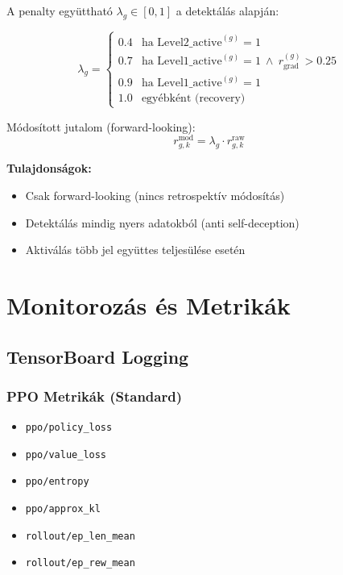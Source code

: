 \documentclass{article}
\begin{document}
A penalty együttható $\lambda_g\in[0,1]$ a detektálás alapján:

\begin{equation}
\lambda_g =
\begin{cases}
0.4 & \text{ha Level2\_active}^{(g)}=1 \\
0.7 & \text{ha Level1\_active}^{(g)}=1 \ \wedge\ r_{\text{grad}}^{(g)} > 0.25 \\
0.9 & \text{ha Level1\_active}^{(g)}=1 \\
1.0 & \text{egyébként (recovery)}
\end{cases}
\end{equation}

Módosított jutalom (forward-looking):
\begin{equation}
r_{g,k}^{\text{mod}} = \lambda_g \cdot r_{g,k}^{\text{raw}}
\end{equation}

\textbf{Tulajdonságok:}
\begin{itemize}
    \item Csak forward-looking (nincs retrospektív módosítás)
    \item Detektálás mindig nyers adatokból (anti self-deception)
    \item Aktiválás több jel együttes teljesülése esetén
\end{itemize}

\section{Monitorozás és Metrikák}

\subsection{TensorBoard Logging}

\subsubsection{PPO Metrikák (Standard)}
\begin{itemize}
    \item \texttt{ppo/policy\_loss}
    \item \texttt{ppo/value\_loss}
    \item \texttt{ppo/entropy}
    \item \texttt{ppo/approx\_kl}
    \item \texttt{rollout/ep\_len\_mean}
    \item \texttt{rollout/ep\_rew\_mean}
\end{itemize}
\end{document}
